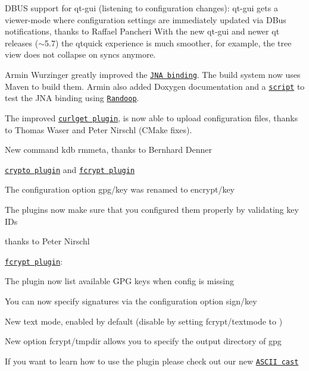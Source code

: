 \begin{DoxyItemize}
\item D\+B\+US support for qt-\/gui (listening to configuration changes)\+: qt-\/gui gets a viewer-\/mode where configuration settings are immediately updated via D\+Bus notifications, thanks to Raffael Pancheri With the new qt-\/gui and newer qt releases ($\sim$5.7) the qtquick experience is much smoother, for example, the tree view does not collapse on syncs anymore.
\item Armin Wurzinger greatly improved the \href{https://www.libelektra.org/bindings/jna}{\tt J\+NA binding}. The build system now uses Maven to build them. Armin also added Doxygen documentation and a \href{http://master.libelektra.org/scripts/randoop/randoop.in}{\tt script} to test the J\+NA binding using \href{https://randoop.github.io/randoop}{\tt Randoop}.
\item The improved \href{https://www.libelektra.org/plugins/curlget}{\tt curlget plugin}, is now able to upload configuration files, thanks to Thomas Waser and Peter Nirschl (C\+Make fixes).
\item New command {\ttfamily kdb rmmeta}, thanks to Bernhard Denner
\item \href{https://www.libelektra.org/plugins/crypto}{\tt crypto plugin} and \href{https://www.libelektra.org/plugins/fcrypt}{\tt fcrypt plugin}
\begin{DoxyItemize}
\item The configuration option {\ttfamily gpg/key} was renamed to {\ttfamily encrypt/key}
\item The plugins now make sure that you configured them properly by validating key I\+Ds
\item thanks to Peter Nirschl
\end{DoxyItemize}
\item \href{https://www.libelektra.org/plugins/fcrypt}{\tt fcrypt plugin}\+:
\begin{DoxyItemize}
\item The plugin now list available G\+PG keys when config is missing
\item You can now specify signatures via the configuration option {\ttfamily sign/key}
\item New text mode, enabled by default (disable by setting {\ttfamily fcrypt/textmode} to {})
\item New option {\ttfamily fcrypt/tmpdir} allows you to specify the output directory of {\ttfamily gpg}
\item If you want to learn how to use the plugin please check out our new \href{https://asciinema.org/a/136021}{\tt A\+S\+C\+II cast}

\end{DoxyItemize}
\end{DoxyItemize}

